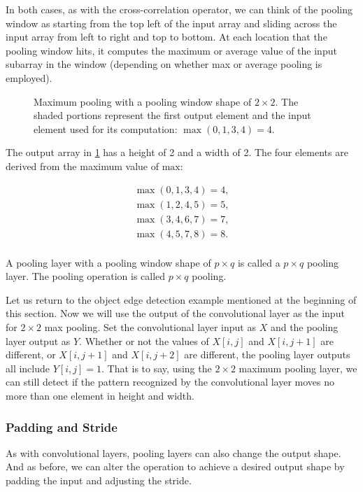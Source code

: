 In both cases, as with the cross-correlation operator, we can think of the pooling window as starting from the top left of the input array and sliding across the input array from left to right and top to bottom. At each location that the pooling window hits, it computes the maximum or average value of the input subarray in the window (depending on whether max or average pooling is employed).

\begin{figure}[hpt]
	\centering
	
	\caption{Maximum pooling with a pooling window shape of $2\times2$. The shaded portions represent the first output element and the input element used for its computation:  $\max(0,1,3,4)=4$.}
	\label{fig:pooling}
\end{figure}

The output array in \cref{fig:pooling} has a height of 2 and a width of 2. The four elements are derived from the maximum value of $\text{max}$:

\begin{align*}
\max(0,1,3,4)=4,\\
\max(1,2,4,5)=5,\\
\max(3,4,6,7)=7,\\
\max(4,5,7,8)=8.\\
\end{align*}

A pooling layer with a pooling window shape of $p \times q$ is called a $p \times q$ pooling layer. The pooling operation is called $p \times q$ pooling.

Let us return to the object edge detection example mentioned at the beginning of this section. Now we will use the output of the convolutional layer as the input for $2 \times 2$  max pooling. Set the convolutional layer input as $X$ and the pooling layer output as $Y$. Whether or not the values of $X[i, j]$ and $X[i, j+1]$ are different, or $X[i, j+1]$ and $X[i, j+2]$ are different, the pooling layer outputs all include $Y[i, j]=1$. That is to say, using the $2 \times 2$ maximum pooling layer, we can still detect if the pattern recognized by the convolutional layer moves no more than one element in height and width.

\subsubsection{Padding and Stride}

As with convolutional layers, pooling layers can also change the output shape. And as before, we can alter the operation to achieve a desired output shape by padding the input and adjusting the stride.

